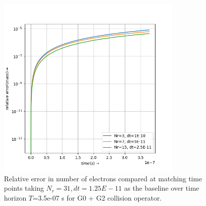 \documentclass{article}
\begin{document}
\begin{figure}[H]
	\centering
	\includegraphics[width=0.8\textwidth]{fig/g02_mass_convergence.png}
	\caption{Relative error in number of electrons compared at matching time points taking $N_r=31,dt=1.25E-11$ as the baseline over time horizon $T$=3.5e-07 s for G0 + G2 collision operator. }
\end{figure}


\end{document}

